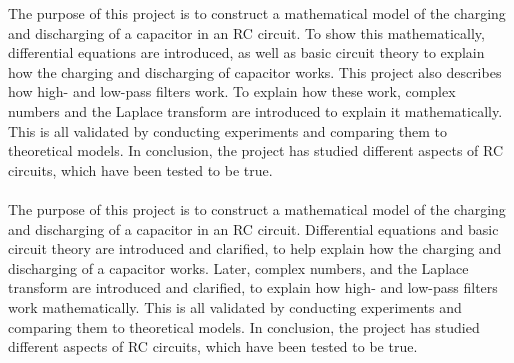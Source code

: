 The purpose of this project is to construct a mathematical model of the charging and discharging of a capacitor in an RC circuit. To show this mathematically, differential equations are introduced, as well as basic circuit theory to explain how the charging and discharging of capacitor works. This project also describes how high- and low-pass filters work. To explain how these work, complex numbers and the Laplace transform are introduced to explain it mathematically. This is all validated by conducting experiments and comparing them to theoretical models. In conclusion, the project has studied different aspects of RC circuits, which have been tested to be true. \\ \\
The purpose of this project is to construct a mathematical model of the charging and discharging of a capacitor in an RC circuit. Differential equations and basic circuit theory are introduced and clarified, to help explain how the charging and discharging of a capacitor works. Later, complex numbers, and the Laplace transform are introduced and clarified, to explain how high- and low-pass filters work mathematically. This is all validated by conducting experiments and comparing them to theoretical models. In conclusion, the project has studied different aspects of RC circuits, which have been tested to be true.
 
